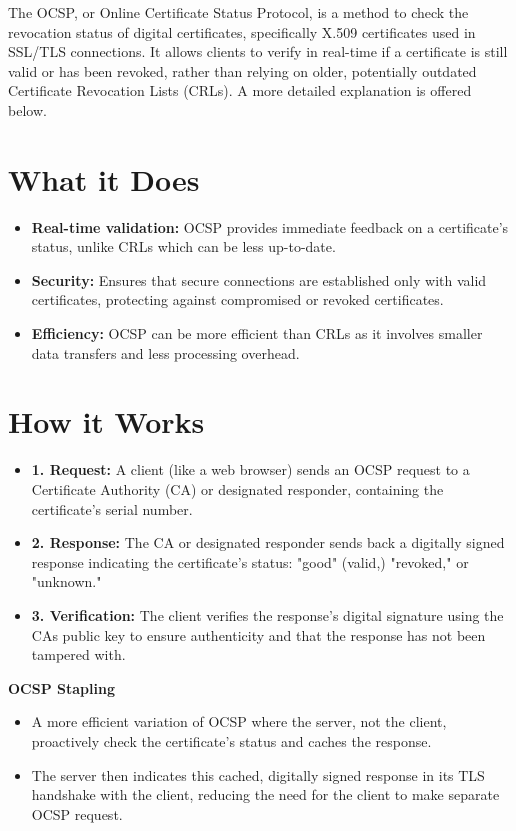 \hrulefill

 The OCSP, or Online Certificate Status Protocol, is a method to check the revocation status of digital certificates, specifically X.509 certificates used in SSL/TLS connections. It allows clients to verify in real-time if a certificate is still valid or has been revoked, rather than relying on older, potentially outdated Certificate Revocation Lists (CRLs). A more detailed explanation is offered below.

\section{What it Does}
    \begin{itemize}
        \item \textbf{Real-time validation:} OCSP provides immediate feedback on a certificate's status, unlike CRLs which can be less up-to-date.
        \item \textbf{Security:} Ensures that secure connections are established only with valid certificates, protecting against compromised or revoked certificates.
        \item \textbf{Efficiency:} OCSP can be more efficient than CRLs as it involves smaller data transfers and less processing overhead.
    \end{itemize}
\section{How it Works}
\begin{itemize}
    \item \textbf{1. Request:} A client (like a web browser) sends an OCSP request to a Certificate Authority (CA) or designated responder, containing the certificate's serial number.
    \item \textbf{2. Response:} The CA or designated responder sends back a digitally signed response indicating the certificate's status: "good" (valid,) "revoked," or "unknown."
    \item \textbf{3. Verification:} The client verifies the response's digital signature using the CAs public key to ensure authenticity and that the response has not been tampered with.

\end{itemize}
\textbf{OCSP Stapling}
\begin{itemize}
    \item A more efficient variation of OCSP where the server, not the client, proactively check the certificate's status and caches the response.
    \item The server then indicates this cached, digitally signed response in its TLS handshake with the client, reducing the need for the client to make separate OCSP request.
\end{itemize}






